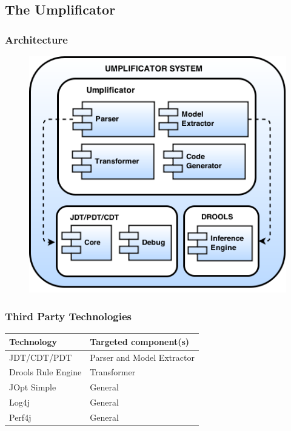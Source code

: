 \documentclass[xcolor=table]{beamer}
\begin{document}

\subsection{The Umplificator} 

\begin{frame}
\frametitle{Architecture}
\begin{figure}
\includegraphics[width=0.6\linewidth]{Figures/UmplificatorComponents}
\end{figure}
\end{frame}


\begin{frame}
\frametitle{Third Party Technologies}

\begin{table}[h]
\begin{tabular}{l|l}
\toprule
\rowcolor[HTML]{BBDAFF}
\textbf{Technology} & \textbf{Targeted component(s)}   \\ \midrule
JDT/CDT/PDT  & Parser and Model Extractor \\ \hline 
Drools Rule Engine & Transformer  	 \\ \hline	
JOpt Simple & General  \\ \hline	
Log4j & General 	\\ \hline	
Perf4j & General  \\ \bottomrule
\end{tabular}
\end{table}
\end{frame}
\end{document}
